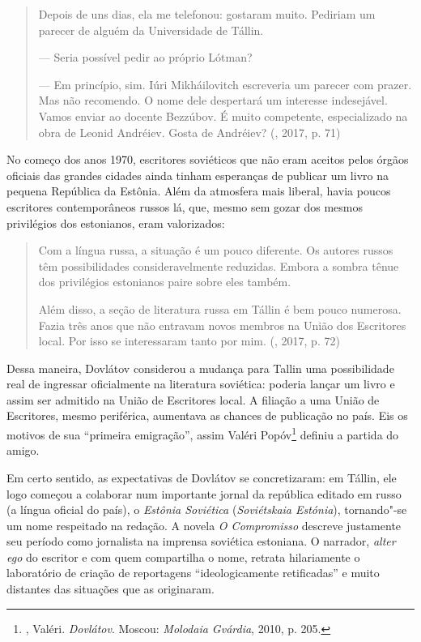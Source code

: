 \begin{quotation}
Depois de uns dias, ela me telefonou: gostaram muito. Pe­diriam um
parecer de alguém da Universidade de Tállin.

--- Seria possível pedir ao próprio Lótman?

--- Em princípio, sim. Iúri Mikháilovitch escreveria um pa­recer com
prazer. Mas não recomendo. O nome dele despertará um interesse
indesejável. Vamos enviar ao docente Bezzúbov. É muito competente,
especializado na obra de Leonid Andréiev. Gosta de Andréiev? 
{}(, 2017, p. 71)
\end{quotation}

No começo dos anos 1970, escritores soviéticos que não eram aceitos
pelos órgãos oficiais das grandes cidades ainda tinham esperanças de
publicar um livro na pequena República da Estônia. Além da atmosfera
mais liberal, havia poucos escritores contemporâneos russos lá, que,
mesmo sem gozar dos mesmos privilégios dos estonianos, eram valorizados:

\begin{quotation}
Com a língua russa, a situação é um pouco diferente. Os au­tores russos
têm possibilidades consideravelmente reduzidas. Embora a sombra tênue
dos privilégios estonianos paire sobre eles também.

Além disso, a seção de literatura russa em Tállin é bem pou­co numerosa.
Fazia três anos que não entravam novos mem­bros na União dos Escritores
local. Por isso se interessaram tanto por mim.
{}(, 2017, p. 72)
\end{quotation}

Dessa maneira, Dovlátov considerou a mudança para Tallin uma
possibilidade real de ingressar oficialmente na literatura soviética:
poderia lançar um livro e assim ser admitido na União de Escritores
local. A filiação a uma União de Escritores, mesmo periférica, aumentava
as chances de publicação no país. Eis os motivos de sua
``primeira emigração'', assim Valéri Popóv\footnote{, Valéri.
  \emph{Dovlátov}. Moscou: \emph{Molodaia Gvárdia}, 2010, p. 205.}
definiu a partida do amigo.

Em certo sentido, as expectativas de Dovlátov se concretizaram: em
Tállin, ele logo começou a colaborar num importante jornal da república
editado em russo (a língua oficial do país), o \emph{Estônia Soviética}
(\emph{Soviétskaia Estónia}), tornando"-se um nome respeitado na redação.
A novela \emph{O Compromisso} descreve justamente seu período como
jornalista na imprensa soviética estoniana. O narrador, \emph{alter ego}
do escritor e com quem compartilha o nome, retrata hilariamente o
laboratório de criação de reportagens ``ideologicamente retificadas'' e
muito distantes das situações que as originaram.

